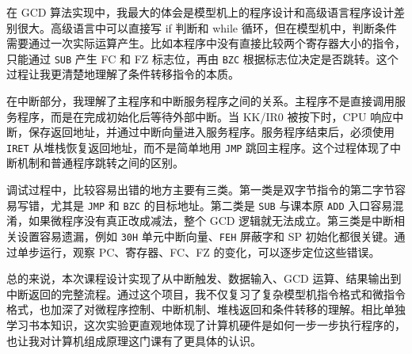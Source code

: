 \documentclass[UTF8,12pt,a4paper]{ctexart}
\newcommand{\hex}[1]{\texttt{#1H}}
\newcommand{\inst}[1]{\texttt{#1}}
\begin{document}
在 GCD 算法实现中，我最大的体会是模型机上的程序设计和高级语言程序设计差别很大。高级语言中可以直接写 if 判断和 while 循环，但在模型机中，判断条件需要通过一次实际运算产生。比如本程序中没有直接比较两个寄存器大小的指令，只能通过 \inst{SUB} 产生 FC 和 FZ 标志位，再由 \inst{BZC} 根据标志位决定是否跳转。这个过程让我更清楚地理解了条件转移指令的本质。

在中断部分，我理解了主程序和中断服务程序之间的关系。主程序不是直接调用服务程序，而是在完成初始化后等待外部中断。当 KK/IR0 被按下时，CPU 响应中断，保存返回地址，并通过中断向量进入服务程序。服务程序结束后，必须使用 \inst{IRET} 从堆栈恢复返回地址，而不是简单地用 \inst{JMP} 跳回主程序。这个过程体现了中断机制和普通程序跳转之间的区别。

调试过程中，比较容易出错的地方主要有三类。第一类是双字节指令的第二字节容易写错，尤其是 \inst{JMP} 和 \inst{BZC} 的目标地址。第二类是 \inst{SUB} 与课本原 \inst{ADD} 入口容易混淆，如果微程序没有真正改成减法，整个 GCD 逻辑就无法成立。第三类是中断相关设置容易遗漏，例如 \hex{30} 单元中断向量、\hex{FE} 屏蔽字和 SP 初始化都很关键。通过单步运行，观察 PC、寄存器、FC、FZ 的变化，可以逐步定位这些错误。

总的来说，本次课程设计实现了从中断触发、数据输入、GCD 运算、结果输出到中断返回的完整流程。通过这个项目，我不仅复习了复杂模型机指令格式和微指令格式，也加深了对微程序控制、中断机制、堆栈返回和条件转移的理解。相比单独学习书本知识，这次实验更直观地体现了计算机硬件是如何一步一步执行程序的，也让我对计算机组成原理这门课有了更具体的认识。
\end{document}
